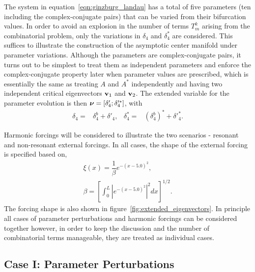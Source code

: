 The system in equation~\eqref{eqn:ginzburg_landau} has a total of five parameters (ten including the complex-conjugate pairs) that can be varied from their bifurcation values. In order to avoid an explosion in the number of terms $T^{k}_{m}$ arising from the combinatorial problem, only the variations in $\delta_{4}$ and $\delta^{*}_{4}$ are considered. This suffices to illustrate the construction of the asymptotic center manifold under parameter variations. Although the parameters are complex-conjugate pairs, it turns out to be simplest to treat them as independent parameters and enforce the complex-conjugate property later when parameter values are prescribed, which is essentially the same as treating $A$ and $A^{*}$ independently and having two independent critical eigenvectors $\mathbf{v}_{1}$ and $\mathbf{v}_{2}$. 
The extended variable for the parameter evolution is then $\boldsymbol{\nu} = [\delta'_{4};\delta'^{*}_{4}]$, with 
\begin{align}
	\delta_{4} =& \delta^{b}_{4} + \delta'_{4}, \nonumber & 
	\delta^{*}_{4} =& (\delta^{b}_{4})^{*} + \delta'^{*}_{4}. \nonumber
\end{align}

Harmonic forcings will be considered to illustrate the two scenarios - resonant and non-resonant external forcings. In all cases, the shape of the external forcing is specified based on,
\begin{subequations}
	\label{eqn:forcing_shape0}
\begin{align}
	\xi(x) = \dfrac{1}{\beta}e^{-(x - 5.0)^{2}}, \\
	\beta = \left[\int_{0}^{L} |e^{-(x - 5.0)^{2}}|^{2}dx\right]^{1/2}.
\end{align} 
\end{subequations}
The forcing shape is also shown in figure~\ref{fig:extended_eigenvectors}. In principle all cases of parameter perturbations and harmonic forcings can be considered together however, in order to keep the discussion and the number of combinatorial terms manageable, they are treated as individual cases. 

\subsection{Case I: Parameter Perturbations}
\label{sec:parameter-perturbation}

